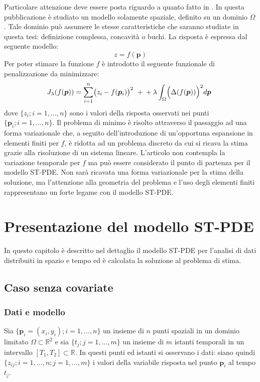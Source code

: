 \documentclass[a4paper,11pt,twoside,openright]{book}							%
\begin{document}
Particolare attenzione deve essere posta riguardo a quanto fatto in \cite{art:sangalli}. In questa pubblicazione è studiato un modello solamente spaziale, definito su un dominio $\Omega$. Tale dominio può assumere le stesse caratteristiche che saranno studiate in questa tesi: definizione complessa, concavità o buchi. La risposta è espressa dal seguente modello:
$$
z=f(\bm{p})
$$
Per poter stimare la funzione $f$ è introdotto il seguente funzionale di penalizzazione da minimizzare:
$$
J_{\lambda }(f(\bm p))=\sum_{i=1}^n \bigl( z_{i} - f(\bm p_i) \bigr)^2 \ + \\
+\lambda\int_{\Omega} \Bigl( \Delta(  f(\bm p)  ) \Bigr)^2 d \bm{p} \ 
$$
dove $\{ z_{i};i=1, \ldots , n\}$ sono i valori della risposta osservati nei punti $\{\bm p_i;i=1, \ldots , n\}$.
Il problema di minimo è risolto attraverso il passaggio ad una forma variazionale che, a seguito dell'introduzione di un'opportuna espansione in elementi finiti per $f$, è ridotta ad un problema discreto da cui si ricava la stima grazie alla risoluzione di un sistema lineare. L'articolo \cite{art:sangalli} non contempla la variazione temporale per $f$ ma può essere considerato il punto di partenza per il modello ST-PDE. Non sarà ricavata una forma variazionale per la stima della soluzione, ma l'attenzione alla geometria del problema e l'uso degli elementi finiti rappresentano un forte legame con il modello ST-PDE.

\chapter{Presentazione del modello ST-PDE}
\label{cap:modello}
In questo capitolo è descritto nel dettaglio il modello ST-PDE per l'analisi di dati distribuiti in spazio e tempo ed è calcolata la soluzione al problema di stima.


\section{Caso senza covariate}

\subsection{Dati e modello}

Sia $\{\bm p_i = (x_i,y_i); i=1, \ldots , n\}$ un insieme di $n$ punti spaziali in un dominio limitato $\Omega \subset \mathbb R^2$ e sia $\{t_j ; j=1, \ldots , m\}$ un insieme di $m$ istanti temporali in un intervallo $[T_1,T_2]\subset \mathbb R$. In questi punti ed istanti si osservano i dati: siano quindi $\{ z_{ij};i=1, \ldots , n; j=1, \ldots , m \}$ i valori della variabile risposta nel punto $\bm p_i$ al tempo $t_j$.
\end{document}
